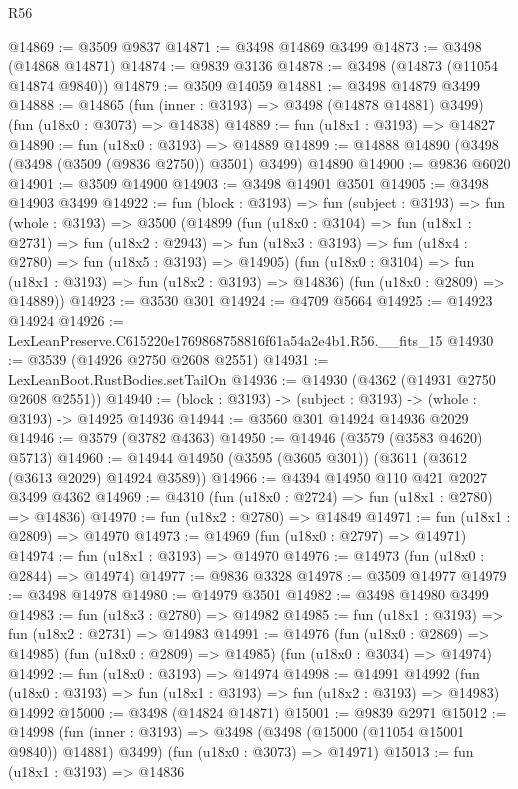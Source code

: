 \begin{lexlean}{R56}
\begin{coremodule}
@14869 := @3509 @9837
@14871 := @3498 @14869 @3499
@14873 := @3498 (@14868 @14871)
@14874 := @9839 @3136
@14878 := @3498 (@14873 (@11054 @14874 @9840))
@14879 := @3509 @14059
@14881 := @3498 @14879 @3499
@14888 := @14865
    (fun (inner : @3193) => @3498 (@14878 @14881) @3499)
    (fun (u18x0 : @3073) => @14838)
@14889 := fun (u18x1 : @3193) => @14827
@14890 := fun (u18x0 : @3193) => @14889
@14899 := @14888 @14890 (@3498 (@3498 (@3509 (@9836 @2750)) @3501) @3499) @14890
@14900 := @9836 @6020
@14901 := @3509 @14900
@14903 := @3498 @14901 @3501
@14905 := @3498 @14903 @3499
@14922 := fun (block : @3193) =>
  fun (subject : @3193) =>
  fun (whole : @3193) =>
  @3500
    (@14899
      (fun (u18x0 : @3104) =>
      fun (u18x1 : @2731) =>
      fun (u18x2 : @2943) =>
      fun (u18x3 : @3193) => fun (u18x4 : @2780) => fun (u18x5 : @3193) => @14905)
      (fun (u18x0 : @3104) => fun (u18x1 : @3193) => fun (u18x2 : @3193) => @14836)
      (fun (u18x0 : @2809) => @14889))
@14923 := @3530 @301
@14924 := @4709 @5664
@14925 := @14923 @14924
@14926 := LexLeanPreserve.C615220e1769868758816f61a54a2e4b1.R56.__fits_15
@14930 := @3539 (@14926 @2750 @2608 @2551)
@14931 := LexLeanBoot.RustBodies.setTailOn
@14936 := @14930 (@4362 (@14931 @2750 @2608 @2551))
@14940 := (block : @3193) -> (subject : @3193) -> (whole : @3193) -> @14925 @14936
@14944 := @3560 @301 @14924 @14936 @2029
@14946 := @3579 (@3782 @4363)
@14950 := @14946 (@3579 (@3583 @4620) @5713)
@14960 := @14944 @14950 (@3595 (@3605 @301)) (@3611 (@3612 (@3613 @2029) @14924 @3589))
@14966 := @4394 @14950 @110 @421 @2027 @3499 @4362
@14969 := @4310 (fun (u18x0 : @2724) => fun (u18x1 : @2780) => @14836)
@14970 := fun (u18x2 : @2780) => @14849
@14971 := fun (u18x1 : @2809) => @14970
@14973 := @14969 (fun (u18x0 : @2797) => @14971)
@14974 := fun (u18x1 : @3193) => @14970
@14976 := @14973 (fun (u18x0 : @2844) => @14974)
@14977 := @9836 @3328
@14978 := @3509 @14977
@14979 := @3498 @14978
@14980 := @14979 @3501
@14982 := @3498 @14980 @3499
@14983 := fun (u18x3 : @2780) => @14982
@14985 := fun (u18x1 : @3193) => fun (u18x2 : @2731) => @14983
@14991 := @14976
    (fun (u18x0 : @2869) => @14985)
    (fun (u18x0 : @2809) => @14985)
    (fun (u18x0 : @3034) => @14974)
@14992 := fun (u18x0 : @3193) => @14974
@14998 := @14991
    @14992
    (fun (u18x0 : @3193) => fun (u18x1 : @3193) => fun (u18x2 : @3193) => @14983)
    @14992
@15000 := @3498 (@14824 @14871)
@15001 := @9839 @2971
@15012 := @14998
    (fun (inner : @3193) => @3498 (@3498 (@15000 (@11054 @15001 @9840)) @14881) @3499)
    (fun (u18x0 : @3073) => @14971)
@15013 := fun (u18x1 : @3193) => @14836

\end{coremodule}
\end{lexlean}
